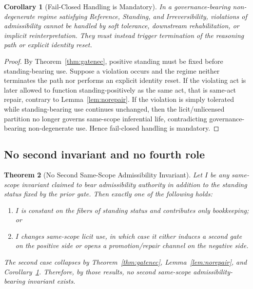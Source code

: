 \documentclass[11pt]{article}
\newtheorem{theorem}{Theorem}[section]
\newtheorem{corollary}[theorem]{Corollary}
\begin{document}
\begin{corollary}[Fail-Closed Handling is Mandatory]
\label{cor:failclosed}
In a governance-bearing non-degenerate regime satisfying Reference, Standing, and Irreversibility, violations of admissibility cannot be handled by soft tolerance, downstream rehabilitation, or implicit reinterpretation. They must instead trigger termination of the reasoning path or explicit identity reset.
\end{corollary}

\begin{proof}
By Theorem~\ref{thm:gatenec}, positive standing must be fixed before standing-bearing use. Suppose a violation occurs and the regime neither terminates the path nor performs an explicit identity reset. If the violating act is later allowed to function standing-positively as the same act, that is same-act repair, contrary to Lemma~\ref{lem:norepair}. If the violation is simply tolerated while standing-bearing use continues unchanged, then the licit/unlicensed partition no longer governs same-scope inferential life, contradicting governance-bearing non-degenerate use. Hence fail-closed handling is mandatory.
\end{proof}

\subsection{No second invariant and no fourth role}

\begin{theorem}[No Second Same-Scope Admissibility Invariant]
\label{thm:nosecondinv}
Let $I$ be any same-scope invariant claimed to bear admissibility authority in addition to the standing status fixed by the prior gate. Then exactly one of the following holds:
\begin{enumerate}
\item[(i)] $I$ is constant on the fibers of standing status and contributes only bookkeeping; or
\item[(ii)] $I$ changes same-scope licit use, in which case it either induces a second gate on the positive side or opens a promotion/repair channel on the negative side.
\end{enumerate}
The second case collapses by Theorem~\ref{thm:gatenec}, Lemma~\ref{lem:norepair}, and Corollary~\ref{cor:failclosed}. Therefore, by those results, no second same-scope admissibility-bearing invariant exists.
\end{theorem}
\end{document}
